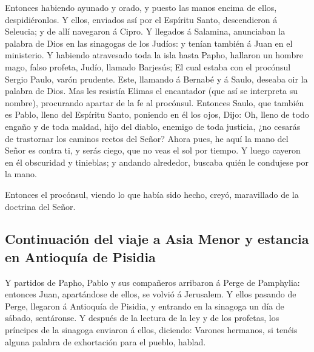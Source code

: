  Entonces habiendo ayunado y orado, y puesto las manos
encima de ellos, despidiéronlos.  Y ellos, enviados así por
el Espíritu Santo, descendieron á Seleucia; y de allí navegaron á Cipro.
 Y llegados á Salamina, anunciaban la palabra de Dios en las
sinagogas de los Judíos: y tenían también á Juan en el ministerio.
 Y habiendo atravesado toda la isla hasta Papho, hallaron un
hombre mago, falso profeta, Judío, llamado Barjesús;  El
cual estaba con el procónsul Sergio Paulo, varón prudente. Este,
llamando á Bernabé y á Saulo, deseaba oir la palabra de Dios.
 Mas les resistía Elimas el encantador (que así se
interpreta su nombre), procurando apartar de la fe al procónsul.
 Entonces Saulo, que también es Pablo, lleno del Espíritu
Santo, poniendo en él los ojos,  Dijo: Oh, lleno de todo
engaño y de toda maldad, hijo del diablo, enemigo de toda justicia, ¿no
cesarás de trastornar los caminos rectos del Señor?  Ahora
pues, he aquí la mano del Señor es contra ti, y serás ciego, que no veas
el sol por tiempo. Y luego cayeron en él obscuridad y tinieblas; y
andando alrededor, buscaba quién le condujese por la mano.

 Entonces el procónsul, viendo lo que había sido hecho,
creyó, maravillado de la doctrina del Señor.

\hypertarget{continuaciuxf3n-del-viaje-a-asia-menor-y-estancia-en-antioquuxeda-de-pisidia}{%
\subsection{Continuación del viaje a Asia Menor y estancia en Antioquía
de
Pisidia}\label{continuaciuxf3n-del-viaje-a-asia-menor-y-estancia-en-antioquuxeda-de-pisidia}}

 Y partidos de Papho, Pablo y sus compañeros arribaron á
Perge de Pamphylia: entonces Juan, apartándose de ellos, se volvió á
Jerusalem.  Y ellos pasando de Perge, llegaron á Antioquía
de Pisidia, y entrando en la sinagoga un día de sábado, sentáronse.
 Y después de la lectura de la ley y de los profetas, los
príncipes de la sinagoga enviaron á ellos, diciendo: Varones hermanos,
si tenéis alguna palabra de exhortación para el pueblo, hablad.

